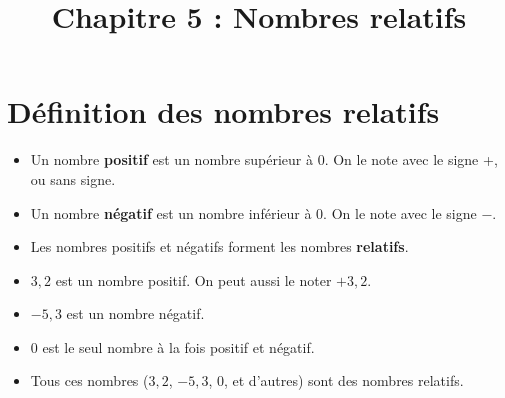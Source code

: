 \documentclass[a4paper,11pt]{article}
\title{Chapitre 5 : Nombres relatifs}
\date{}
\author{}
\begin{document}
\maketitle

\section{Définition des nombres relatifs}

\begin{cours}
	\begin{itemize}
		\item Un nombre \textbf{positif} est un nombre supérieur à 0. On le note avec le signe +, ou sans signe.
		\item Un nombre \textbf{négatif} est un nombre inférieur à 0. On le note avec le signe −.
		\item Les nombres positifs et négatifs forment les nombres \textbf{relatifs}.
	\end{itemize}
\end{cours}

\begin{exemple}
	\begin{itemize}
		\item $3,2$ est un nombre positif. On peut aussi le noter $+3,2$.
		\item $-5,3$ est un nombre négatif.
		\item $0$ est le seul nombre à la fois positif et négatif.
		\item Tous ces nombres ($3,2$, $-5,3$, $0$, et d'autres) sont des nombres relatifs.
	\end{itemize}
\end{exemple}
\end{document}
